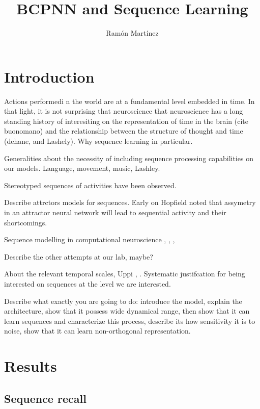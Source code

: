 \documentclass[10pt,a4paper]{article}
\author{Ram\'on Mart\'inez}
\title{BCPNN and Sequence Learning}
\begin{document}
\maketitle

\section{Introduction}
Actions performedi n the world are at a fundamental level embedded in time. In that light, it is not surprising that neuroscience that neuroscience has a long standing history of interesiting on the representation of time in the brain (cite buonomano) and the relationship between the structure of thought and time (dehane, and Lashely). Why sequence learning in particular. 

Generalities about the necessity of including sequence processing capabilities on our models. Language, movement, music, Lashley.

Stereotyped sequences of activities have been observed. 

Describe attrctors models for sequences. Early on Hopfield noted that assymetry in an attractor neural network will lead to sequential activity \cite{hopfield1982neural} \cite{hopfield1984neurons} \cite{amari1972learning}  \cite{kleinfeld1986sequential} \cite{sompolinsky1986temporal} \cite{amit1992modeling} and their shortcomings.

Sequence modelling in computational neuroscience \cite{veliz2015networks}, \cite{fiete2010spike},
 \cite{murray2017learning} \cite{verduzco2012model}, \cite{wang2017model} \cite{pereira2018unsupervised}

Describe the other attempts at our lab, maybe?

About the relevant temporal scales, Uppi \cite{bhalla2017dendrites}, \cite{paton2018neural}. Systematic justifcation for being interested on sequences at the level we are interested. 

Describe what exactly you are going to do: introduce the model, explain the architecture, show that it possess wide dynamical range, then show that it can learn sequences and characterize this process, describe its how sensitivity it is to noise, show that it can learn non-orthogonal representation. 


\section{Results}
\subsection{Sequence recall}
\end{document}
